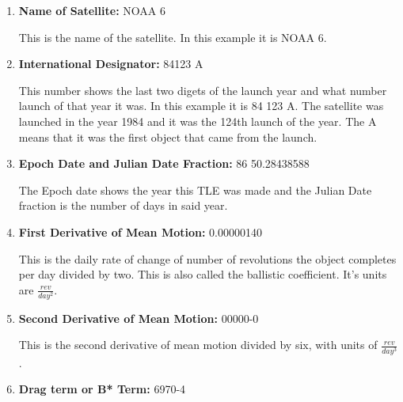 \documentclass[12pt]{article}
\begin{document}
	\begin{enumerate}\singlespacing
		\item \textbf{Name of Satellite:} NOAA 6
		
		This is the name of the satellite. In this example it is NOAA 6.
		\item 	\textbf{International Designator:} 84123 A
		
		This number shows the last two digets of the launch year and what number launch of that year it was. In this example it is 84 123 A. The satellite was launched in the year 1984 and it was the 124th launch of the year. The A means that it was the first object that came from the launch. %
		
		\item \textbf{Epoch Date and Julian Date Fraction:} 86 50.28438588
		
		The Epoch date shows the year this TLE was made and the Julian Date fraction is the number of days in said year. 
		
		\item \textbf{First Derivative of Mean Motion:} 0.00000140
		
		This is the daily rate of change of number of revolutions the object completes per day divided by two. This is also called the ballistic coefficient.\cite{NASATLE} It's units are $\frac{rev}{day^2}$. 
		
		\item \textbf{Second Derivative of Mean Motion:} 00000-0
		
		This is the second derivative of mean motion divided by six, with units of $\frac{rev}{day^3}$.
		
		\item \textbf{Drag term or B* Term: }6970-4
		

\end{enumerate}
\end{document}
